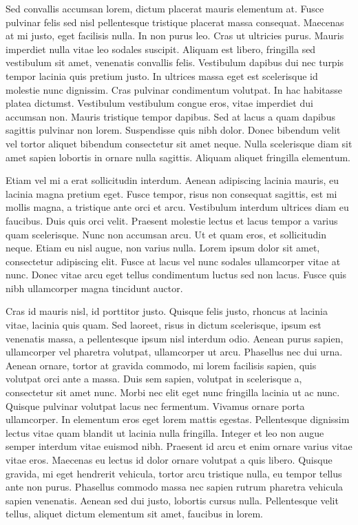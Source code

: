 Sed convallis accumsan lorem, dictum placerat mauris elementum at.
Fusce pulvinar felis sed nisl pellentesque tristique placerat massa consequat.
Maecenas at mi justo, eget facilisis nulla.
In non purus leo.
Cras ut ultricies purus.
Mauris imperdiet nulla vitae leo sodales suscipit.
Aliquam est libero, fringilla sed vestibulum sit amet, venenatis convallis felis.
Vestibulum dapibus dui nec turpis tempor lacinia quis pretium justo.
In ultrices massa eget est scelerisque id molestie nunc dignissim.
Cras pulvinar condimentum volutpat.
In hac habitasse platea dictumst.
Vestibulum vestibulum congue eros, vitae imperdiet dui accumsan non.
Mauris tristique tempor dapibus.
Sed at lacus a quam dapibus sagittis pulvinar non lorem.
Suspendisse quis nibh dolor.
Donec bibendum velit vel tortor aliquet bibendum consectetur sit amet neque.
Nulla scelerisque diam sit amet sapien lobortis in ornare nulla sagittis.
Aliquam aliquet fringilla elementum.

Etiam vel mi a erat sollicitudin interdum.
Aenean adipiscing lacinia mauris, eu lacinia magna pretium eget.
Fusce tempor, risus non consequat sagittis, est mi mollis magna, a tristique ante orci et arcu.
Vestibulum interdum ultrices diam eu faucibus.
Duis quis orci velit.
Praesent molestie lectus et lacus tempor a varius quam scelerisque.
Nunc non accumsan arcu.
Ut et quam eros, et sollicitudin neque.
Etiam eu nisl augue, non varius nulla.
Lorem ipsum dolor sit amet, consectetur adipiscing elit.
Fusce at lacus vel nunc sodales ullamcorper vitae at nunc.
Donec vitae arcu eget tellus condimentum luctus sed non lacus.
Fusce quis nibh ullamcorper magna tincidunt auctor.

Cras id mauris nisl, id porttitor justo.
Quisque felis justo, rhoncus at lacinia vitae, lacinia quis quam.
Sed laoreet, risus in dictum scelerisque, ipsum est venenatis massa, a pellentesque ipsum nisl interdum odio.
Aenean purus sapien, ullamcorper vel pharetra volutpat, ullamcorper ut arcu.
Phasellus nec dui urna.
Aenean ornare, tortor at gravida commodo, mi lorem facilisis sapien, quis volutpat orci ante a massa.
Duis sem sapien, volutpat in scelerisque a, consectetur sit amet nunc.
Morbi nec elit eget nunc fringilla lacinia ut ac nunc.
Quisque pulvinar volutpat lacus nec fermentum.
Vivamus ornare porta ullamcorper.
In elementum eros eget lorem mattis egestas.
Pellentesque dignissim lectus vitae quam blandit ut lacinia nulla fringilla.
Integer et leo non augue semper interdum vitae euismod nibh.
Praesent id arcu et enim ornare varius vitae vitae eros.
Maecenas eu lectus id dolor ornare volutpat a quis libero.
Quisque gravida, mi eget hendrerit vehicula, tortor arcu tristique nulla, eu tempor tellus ante non purus.
Phasellus commodo massa nec sapien rutrum pharetra vehicula sapien venenatis.
Aenean sed dui justo, lobortis cursus nulla.
Pellentesque velit tellus, aliquet dictum elementum sit amet, faucibus in lorem.

